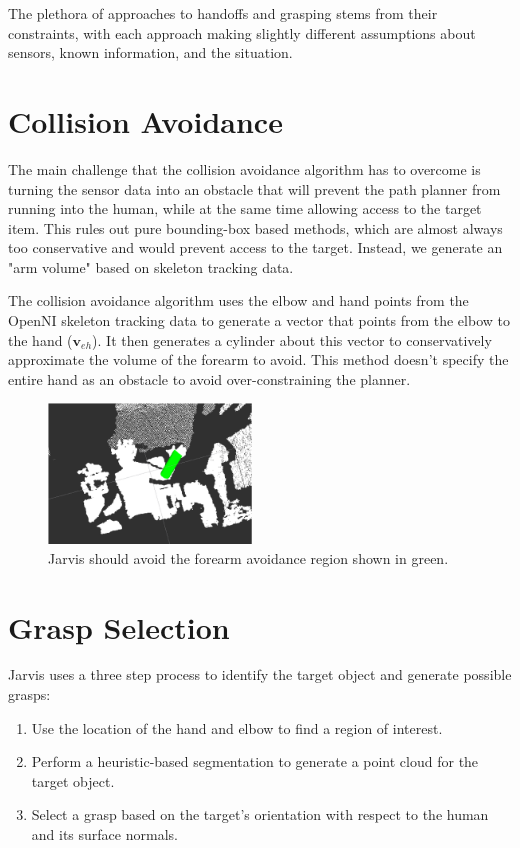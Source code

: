 \documentclass[10pt]{article}
\begin{document}
\par The plethora of approaches to handoffs and grasping stems from their constraints, with each approach making slightly different assumptions about sensors, known information, and the situation. 

\section{Collision Avoidance} \label{sec:avoidance}
\par The main challenge that the collision avoidance algorithm has to overcome is turning the sensor data into an obstacle that will prevent the path planner from running into the human, while at the same time allowing access to the target item. This rules out pure bounding-box based methods, which are almost always too conservative and would prevent access to the target. Instead, we generate an "arm volume" based on skeleton tracking data. 

\par The collision avoidance algorithm uses the elbow and hand points from the OpenNI skeleton tracking data to generate a vector that points from the elbow to the hand ($\textbf{v}_{eh}$). It then generates a cylinder about this vector to conservatively approximate the volume of the forearm to avoid. This method doesn't specify the entire hand as an obstacle to avoid over-constraining the planner. 

\begin{figure}
\includegraphics[width=0.48\textwidth]{figures/cropped_arm.eps}  
\caption{Jarvis should avoid the forearm avoidance region shown in green.}
\label{fig:forearm}
\end{figure}    

\section{Grasp Selection} \label{sec:graspid}
Jarvis uses a three step process to identify the target object and generate possible grasps:
\begin{enumerate}
\item Use the location of the hand and elbow to find a region of interest.
\item Perform a heuristic-based segmentation to generate a point cloud for the target object.
\item Select a grasp based on the target's orientation with respect to the human and its surface normals.
\end{enumerate}
\end{document}
